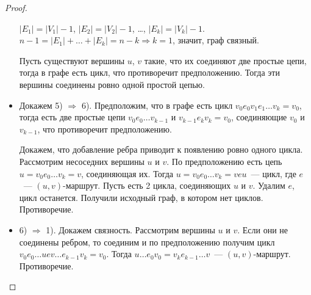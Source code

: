 \begin{theorem}
\begin{proof}
\begin{itemize}
		$|E_1| = |V_1| - 1$, $|E_2| = |V_2| - 1$, \ldots, $|E_k| = |V_k| - 1$. $n - 1 = |E_1| + \ldots + |E_k| = n - k \Rightarrow k = 1$, значит, граф связный.
		
		Пусть существуют вершины $u$, $v$ такие, что их соединяют две простые цепи, тогда в графе есть цикл, что противоречит предположению. Тогда эти вершины соединены ровно одной простой цепью.
		
		\item Докажем 5) $\Rightarrow$ 6). Предположим, что в графе есть цикл $v_0 e_0 v_1 e_1 \ldots v_k = v_0$, тогда есть две простые цепи $v_0 e_0 \ldots v_{k-1}$ и $v_{k-1} e_k v_k = v_0$, соединяющие $v_0$ и $v_{k-1}$, что противоречит предположению.
		
		Докажем, что добавление ребра приводит к появлению ровно одного цикла. Рассмотрим несоседних вершины $u$ и $v$. По предположению есть цепь $u = v_0 e_0 \ldots v_k = v$, соединяющая их. Тогда $u = v_0 e_0 \ldots v_k = v e u$~--- цикл, где $e$~--- $(u, v)$-маршрут. Пусть есть 2 цикла, соединяющих $u$ и $v$. Удалим $e$, цикл останется. Получили исходный граф, в котором нет циклов. Противоречие.
		
		\item 6) $\Rightarrow$ 1). Докажем связность. Рассмотрим вершины $u$ и $v$. Если они не соединены ребром, то соединим и по предположению получим цикл $v_0 e_0 \ldots u e v \ldots e_{k-1} v_k = v_0$. Тогда $u \ldots e_0 v_0 = v_k e_{k-1} \ldots v$~--- $(u, v)$-маршрут. Противоречие.
	\end{itemize}
\end{proof}
\end{theorem}

 


